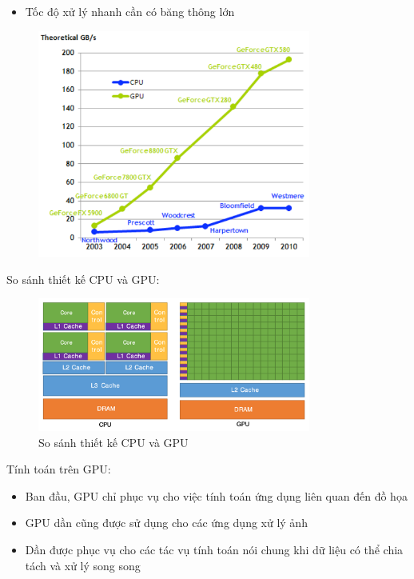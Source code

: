 \documentclass[14pt, a4paper]{article}
\numberwithin{equation}{section}
\numberwithin{figure}{section}
\numberwithin{dl}{section}
\numberwithin{md}{section}
\numberwithin{bd}{section}
\numberwithin{dn}{section}
\numberwithin{hq}{section}
\begin{document}
\begin{itemize}
    \item Tốc độ xử lý nhanh cần có băng thông lớn
\end{itemize}
\begin{figure}[H]
    \centering
    \includegraphics[width=0.8\textwidth]{figures/CUDA/Bandwidth.png}
\end{figure}

So sánh thiết kế CPU và GPU:

\begin{figure}[H]
    \centering
    \includegraphics[width=0.8\textwidth]{figures/CUDA/CPUvsGPU_design.png}
    \caption{So sánh thiết kế CPU và GPU}
\end{figure}

Tính toán trên GPU:

\begin{itemize}
    \item Ban đầu, GPU chỉ phục vụ cho việc tính toán ứng dụng liên quan đến đồ họa
    \item GPU dần cũng được sử dụng cho các ứng dụng xử lý ảnh
    \item Dần được phục vụ cho các tác vụ tính toán nói chung khi dữ liệu có thể chia tách và xử lý song song
\end{itemize}
\end{document}
